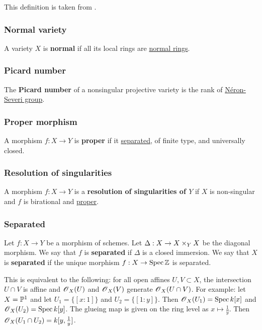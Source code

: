 \documentclass[11pt, english]{article}
\begin{document}
This definition is taken from \cite{kollar_resolution}. 


\subsubsection{Normal variety}
\label{normalvariety}
A variety $X$ is \textbf{normal} if all its local rings are \hyperref[normalring]{normal rings}.

\subsubsection{Picard number}
\label{picardnumber}

The \textbf{Picard number} of a nonsingular projective variety is the rank of \hyperref[neronseveri]{Néron-Severi group}.

\subsubsection{Proper morphism}
\label{proper}
A morphism $f:X \to Y$ is \textbf{proper} if it \hyperref[separated]{separated}, of finite type, and universally closed.

\subsubsection{Resolution of singularities}
\label{resolutionsing}

A morphism $f:X \to Y$ is a \textbf{resolution of singularities of $Y$} if $X$ is non-singular and $f$ is birational and \hyperref[proper]{proper}. 

\subsubsection{Separated}
\label{separated}
Let $f:X \to Y$ be a morphism of schemes. Let $\Delta:X \to X \times_Y X$ be the diagonal morphism. We say that $f$ is \textbf{separated} if $\Delta$ is a closed immersion. We say that $X$ is \textbf{separated} if the unique morphism $f:X \to \operatorname{Spec} \mathbb{Z}$ is separated.

This is equivalent to the following: for all open affines $U,V \subset X$, the intersection $U \cap V$ is affine and $\operatorname{\mathscr{O}}_X(U)$ and $\operatorname{\mathscr{O}}_X(V)$ generate $\operatorname{\mathscr{O}}_X(U \cap V)$. For example: let $X=\mathbb{P}^1$ and let $U_1=\{ [x:1] \}$ and $U_2= \{ [1:y] \}$. Then $\operatorname{\mathscr{O}}_X(U_1)=\operatorname{Spec} k[x]$ and $\operatorname{\mathscr{O}}_X(U_2)=\operatorname{Spec} k[y]$. The glueing map is given on the ring level as $x \mapsto \frac 1y$. Then $\operatorname{\mathscr{O}}_X(U_1 \cap U_2) = k[y,\frac 1y]$. 
\end{document}
